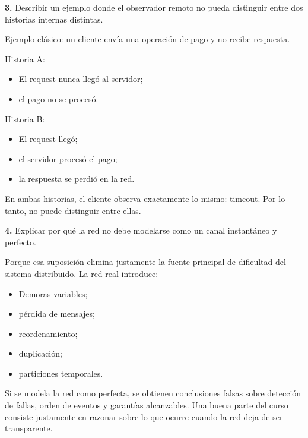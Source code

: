 \documentclass[variant=guia,cover=institutional,mode=screen]{ua-engineering-v6-article}
\begin{document}
\begin{uaexercise}
\textbf{3.}
Describir un ejemplo donde el observador remoto no pueda distinguir entre dos historias internas distintas.
\end{uaexercise}
\begin{uaanswer}
Ejemplo clásico: un cliente envía una operación de pago y no recibe respuesta.

Historia A:
\begin{itemize}
\item El request nunca llegó al servidor;
\item el pago no se procesó.
\end{itemize}

Historia B:
\begin{itemize}
\item El request llegó;
\item el servidor procesó el pago;
\item la respuesta se perdió en la red.
\end{itemize}

En ambas historias, el cliente observa exactamente lo mismo: timeout.
Por lo tanto, no puede distinguir entre ellas.
\end{uaanswer}

\begin{uaexercise}
\textbf{4.}
Explicar por qué la red no debe modelarse como un canal instantáneo y perfecto.
\end{uaexercise}
\begin{uaanswer}
Porque esa suposición elimina justamente la fuente principal de dificultad del sistema distribuido.
La red real introduce:

\begin{itemize}
\item Demoras variables;
\item pérdida de mensajes;
\item reordenamiento;
\item duplicación;
\item particiones temporales.
\end{itemize}

Si se modela la red como perfecta, se obtienen conclusiones falsas sobre detección de fallas, orden de eventos y garantías alcanzables.
Una buena parte del curso consiste justamente en razonar sobre lo que ocurre cuando la red deja de ser transparente.
\end{uaanswer}
\end{document}
